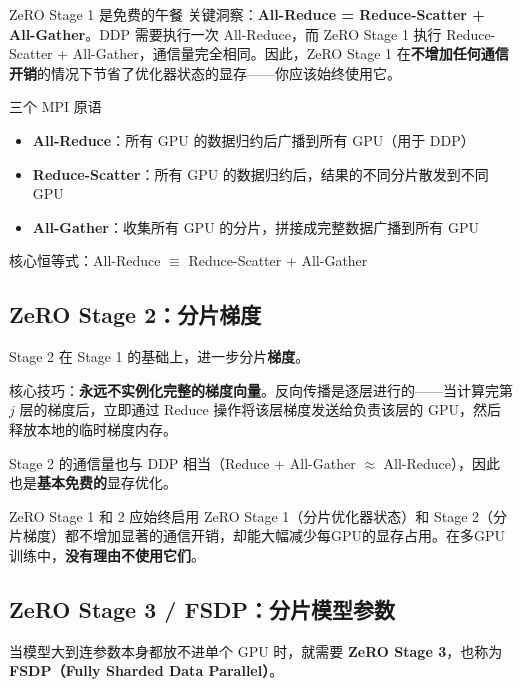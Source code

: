 \documentclass[a4paper]{article}
\begin{document}
\begin{importantbox}{ZeRO Stage 1 是免费的午餐}
关键洞察：\textbf{All-Reduce = Reduce-Scatter + All-Gather}。DDP 需要执行一次 All-Reduce，而 ZeRO Stage 1 执行 Reduce-Scatter + All-Gather，通信量完全相同。因此，ZeRO Stage 1 在\textbf{不增加任何通信开销}的情况下节省了优化器状态的显存——你应该始终使用它。
\end{importantbox}

\begin{knowledgebox}{三个 MPI 原语}
\begin{itemize}
    \item \textbf{All-Reduce}：所有 GPU 的数据归约后广播到所有 GPU（用于 DDP）
    \item \textbf{Reduce-Scatter}：所有 GPU 的数据归约后，结果的不同分片散发到不同 GPU
    \item \textbf{All-Gather}：收集所有 GPU 的分片，拼接成完整数据广播到所有 GPU
\end{itemize}
核心恒等式：All-Reduce $\equiv$ Reduce-Scatter + All-Gather
\end{knowledgebox}

\subsection{ZeRO Stage 2：分片梯度}

Stage 2 在 Stage 1 的基础上，进一步分片\textbf{梯度}。

核心技巧：\textbf{永远不实例化完整的梯度向量}。反向传播是逐层进行的——当计算完第 $j$ 层的梯度后，立即通过 Reduce 操作将该层梯度发送给负责该层的 GPU，然后释放本地的临时梯度内存。





Stage 2 的通信量也与 DDP 相当（Reduce + All-Gather $\approx$ All-Reduce），因此也是\textbf{基本免费的}显存优化。

\begin{importantbox}{ZeRO Stage 1 和 2 应始终启用}
ZeRO Stage 1（分片优化器状态）和 Stage 2（分片梯度）都不增加显著的通信开销，却能大幅减少每GPU的显存占用。在多GPU训练中，\textbf{没有理由不使用它们}。
\end{importantbox}

\subsection{ZeRO Stage 3 / FSDP：分片模型参数}

当模型大到连参数本身都放不进单个 GPU 时，就需要 \textbf{ZeRO Stage 3}，也称为 \textbf{FSDP（Fully Sharded Data Parallel）}。
\end{document}
